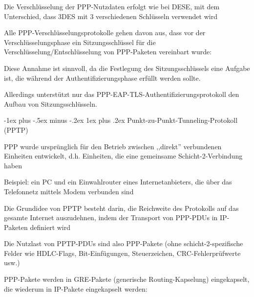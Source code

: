 \documentclass[a4paper]{article}
\makeatletter
\renewcommand{\subsubsection}{\@startsection{subsubsection}{3}{0mm}%
 {-1ex plus -.5ex minus -.2ex}%
 {1ex plus .2ex}%
 {\normalfont\small\bfseries}}
\makeatother
\begin{document}
\begin{multicols}{3}
\begin{itemize*}
\begin{itemize*}
                  \item Die Verschlüsselung der PPP-Nutzdaten erfolgt wie bei DESE, mit dem Unterschied, dass 3DES mit 3 verschiedenen Schlüsseln verwendet wird
            \end{itemize*}
            \item Alle PPP-Verschlüsselungsprotokolle gehen davon aus, dass vor der
            Verschlüsselungsphase ein Sitzungsschlüssel für die
            Verschlüsselung/Entschlüsselung von PPP-Paketen vereinbart wurde:
            \begin{itemize*}
                  \item Diese Annahme ist sinnvoll, da die Festlegung des Sitzungsschlüssels eine Aufgabe ist, die während der Authentifizierungsphase erfüllt werden sollte.
                  \item Allerdings unterstützt nur das PPP-EAP-TLS-Authentifizierungsprotokoll den Aufbau von Sitzungsschlüsseln.
            \end{itemize*}
      \end{itemize*}


      \subsubsection{Punkt-zu-Punkt-Tunneling-Protokoll
            (PPTP)}

      \begin{itemize*}
            \item PPP wurde ursprünglich für den Betrieb zwischen ,,direkt'' verbundenen
            Einheiten entwickelt, d.h. Einheiten, die eine gemeinsame
            Schicht-2-Verbindung haben
            \begin{itemize*}
                  \item Beispiel: ein PC und ein Einwahlrouter eines Internetanbieters, die über das Telefonnetz mittels Modem verbunden sind
            \end{itemize*}
            \item Die Grundidee von PPTP besteht darin, die Reichweite des Protokolls
            auf das gesamte Internet auszudehnen, indem der Transport von PPP-PDUs
            in IP-Paketen definiert wird
            \begin{itemize*}
                  \item Die Nutzlast von PPTP-PDUs sind also PPP-Pakete (ohne schicht-2-spezifische Felder wie HDLC-Flags, Bit-Einfügungen, Steuerzeichen, CRC-Fehlerprüfwerte usw.)
                  \item PPP-Pakete werden in GRE-Pakete (generische Routing-Kapselung) eingekapselt, die wiederum in IP-Pakete eingekapselt werden:
            \end{itemize*}
      \end{itemize*}


\end{multicols}
\end{document}
